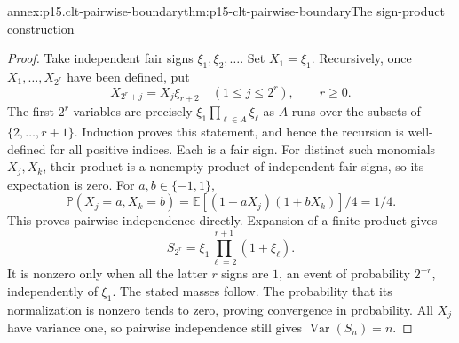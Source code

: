 \begin{annexitem}{annex:p15.clt-pairwise-boundary}{thm:p15-clt-pairwise-boundary}{The sign-product construction}
\begin{proof}
Take independent fair signs \(\xi_1,\xi_2,\ldots\).
Set \(X_1=\xi_1\). Recursively, once
\(X_1,\ldots,X_{2^r}\) have been defined, put
\[
 X_{2^r+j}=X_j\xi_{r+2}\quad(1\leq j\leq2^r),\qquad r\geq0.
 \]
The first \(2^r\) variables are precisely
\(\xi_1\prod_{\ell\in A}\xi_\ell\) as \(A\) runs over the
subsets of \(\{2,\ldots,r+1\}\). Induction proves this statement,
and hence the recursion is well-defined for all positive indices.
Each is a fair sign. For distinct such monomials \(X_j,X_k\),
their product is a nonempty product of independent fair signs,
so its expectation is zero. For \(a,b\in\{-1,1\}\),
\[
 \mathbb P(X_j=a,X_k=b)
 =\mathbb E[(1+aX_j)(1+bX_k)]/4=1/4.
 \]
This proves pairwise independence directly.
Expansion of a finite product gives
\[
 S_{2^r}=\xi_1\prod_{\ell=2}^{r+1}(1+\xi_\ell).
 \]
It is nonzero only when all the latter \(r\) signs are \(1\),
an event of probability \(2^{-r}\), independently of \(\xi_1\).
The stated masses follow. The probability that its normalization
is nonzero tends to zero, proving convergence in probability.
All \(X_j\) have variance one, so pairwise independence still
gives \(\operatorname{Var}(S_n)=n\).
\end{proof}
\end{annexitem}


